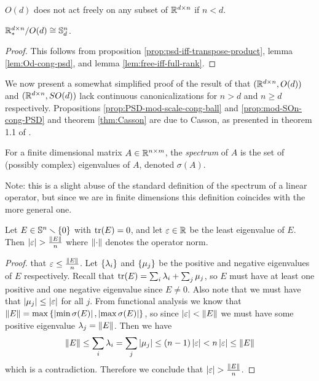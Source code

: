 \begin{corollary}
    $O(d)$ does not act freely on any subset of $\mathbb{R}^{d \times n}$ if $n < d$.
\end{corollary}

\begin{corollary}
    $\mathbb{R}^{d \times n}_* / O(d) \cong \mathbb{S}^n_d$.
    \begin{proof}
        This follows from proposition \ref{prop:psd-iff-transpose-product}, lemma \ref{lem:Od-cong-psd}, and lemma \ref{lem:free-iff-full-rank}.
    \end{proof}
\end{corollary}

We now present a somewhat simplified proof of the result of \cite{colman2013equivariant}  that $(\mathbb{R}^{d \times n}, O(d))$ and $(\mathbb{R}^{d \times n}, SO(d))$ lack continuous canonicalizations for $n > d$ and $n \geq d$ respectively.
Propositions \ref{prop:PSD-mod-scale-cong-ball} and \ref{prop:mod-SOn-cong-PSD} and theorem \ref{thm:Casson} are due to Casson, as presented in theorem 1.1 of \cite{kendall1999shape}.

\begin{definition}
    For a finite dimensional matrix $A \in \mathbb{R}^{n \times m}$, the \emph{spectrum} of $A$ is the set of (possibly complex) eigenvalues of $A$, denoted $\sigma(A)$.

    Note: this is a slight abuse of the standard definition of the spectrum of a linear operator, but since we are in finite dimensions this definition coincides with the more general one.
\end{definition}

\begin{lemma}\label{lem:sym-tr0-eigenbound}
    Let $E \in \mathbb{S}^n \smallsetminus \left\{ 0 \right\}$ with $\operatorname{tr}(E) = 0$, and let $\varepsilon \in \mathbb{R}$ be the least eigenvalue of $E$.
    Then $\left| \varepsilon \right| > \frac{\left\| E \right\|}{n}$ where $\left\| \cdot \right\|$ denotes the operator norm.
    \begin{proof}
        \Afsoc that $\varepsilon \leq \frac{\left\| E \right\|}{n}$.
        Let $\left\{ \lambda_i \right\}$ and $\left\{ \mu_j \right\}$ be the positive and negative eigenvalues of $E$ respectively.
        Recall that $\operatorname{tr}(E) = \sum_i \lambda_i + \sum_j \mu_j$, so $E$ must have at least one positive and one negative eigenvalue since $E \neq 0$.
        Also note that we must have that $\left| \mu_j \right| \leq \left| \varepsilon \right|$ for all $j$.
        From functional analysis we know that $\left\| E \right\| = \max\left\{ \left| \min \sigma(E) \right|, \left| \max \sigma(E) \right| \right\}$, so since $\left| \varepsilon \right| < \left\| E \right\|$ we must have some positive eigenvalue $\lambda_j = \left\| E \right\|$.
        Then we have
        \[
            \left\| E \right\|
            \leq \sum_i \lambda_i
            = \sum_j \left| \mu_j \right|
            \leq (n-1) \left| \varepsilon \right|
            < n \left| \varepsilon \right|
            \leq \left\| E \right\|
        \]
        which is a contradiction.
        Therefore we conclude that $\left| \varepsilon \right| > \frac{\left\| E \right\|}{n}$.
    \end{proof}
\end{lemma}

